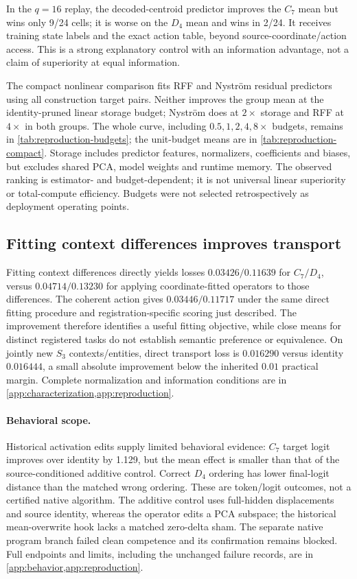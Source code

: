 \documentclass{article}
\begin{document}
In the $q=16$ replay, the decoded-centroid predictor improves the $C_7$ mean but wins only 9/24 cells; it is worse on the $D_4$ mean and wins in 2/24. It receives training state labels and the exact action table, beyond source-coordinate/action access. This is a strong explanatory control with an information advantage, not a claim of superiority at equal information.

The compact nonlinear comparison fits RFF and Nystr\"om residual predictors using all construction target pairs. Neither improves the group mean at the identity-pruned linear storage budget; Nystr\"om does at $2\times$ storage and RFF at $4\times$ in both groups. The whole curve, including $0.5,1,2,4,8\times$ budgets, remains in \cref{tab:reproduction-budgets}; the unit-budget means are in \cref{tab:reproduction-compact}. Storage includes predictor features, normalizers, coefficients and biases, but excludes shared PCA, model weights and runtime memory. The observed ranking is estimator- and budget-dependent; it is not universal linear superiority or total-compute efficiency. Budgets were not selected retrospectively as deployment operating points.

\subsection{Fitting context differences improves transport}
Fitting context differences directly yields losses $0.03426/0.11639$ for $C_7/D_4$, versus $0.04714/0.13230$ for applying coordinate-fitted operators to those differences. The coherent action gives $0.03446/0.11717$ under the same direct fitting procedure and registration-specific scoring just described. The improvement therefore identifies a useful fitting objective, while close means for distinct registered tasks do not establish semantic preference or equivalence. On jointly new $S_3$ contexts/entities, direct transport loss is $0.016290$ versus identity $0.016444$, a small absolute improvement below the inherited $0.01$ practical margin. Complete normalization and information conditions are in \cref{app:characterization,app:reproduction}.

\paragraph{Behavioral scope.}
Historical activation edits supply limited behavioral evidence: $C_7$ target logit improves over identity by 1.129, but the mean effect is smaller than that of the source-conditioned additive control. Correct $D_4$ ordering has lower final-logit distance than the matched wrong ordering. These are token/logit outcomes, not a certified native algorithm. The additive control uses full-hidden displacements and source identity, whereas the operator edits a PCA subspace; the historical mean-overwrite hook lacks a matched zero-delta sham. The separate native program branch failed clean competence and its confirmation remains blocked. Full endpoints and limits, including the unchanged failure records, are in \cref{app:behavior,app:reproduction}.
\end{document}
